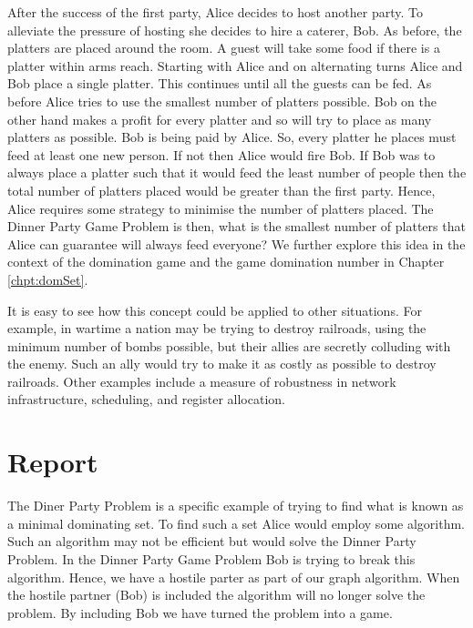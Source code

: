 After the success of the first party, Alice decides to host another party. To alleviate the pressure of hosting she decides to hire a caterer, Bob. As before, the platters are placed around the room. A guest will take some food if there is a platter within arms reach. Starting with Alice and on alternating turns Alice and Bob place a single platter. This continues until all the guests can be fed. As before Alice tries to use the smallest number of platters possible. Bob on the other hand makes a profit for every platter and so will try to place as many platters as possible. Bob is being paid by Alice. So, every platter he places must feed at least one new person. If not then Alice would fire Bob. If Bob was to always place a platter such that it would feed the least number of people then the total number of platters placed would be greater than the first party. Hence, Alice requires some strategy to minimise the number of platters placed. The Dinner Party Game Problem is then, what is the smallest number of platters that Alice can guarantee will always feed everyone? 
We further explore this idea in the context of the domination game and the game domination number in Chapter \ref{chpt:domSet}.

It is easy to see how this concept could be applied to other situations. For example, in wartime a nation may be trying to destroy railroads, using the minimum number of bombs possible, but their allies are secretly colluding with the enemy. Such an ally would try to make it as costly as possible to destroy railroads. Other examples include a measure of robustness in network infrastructure, scheduling, and register allocation.  

\section{Report}

The Diner Party Problem is a specific example of trying to find what is known as a minimal dominating set. To find such a set Alice would employ some algorithm. Such an algorithm may not be efficient but would solve the Dinner Party Problem. In the Dinner Party Game Problem Bob is trying to break this algorithm. Hence, we have a hostile parter as part of our graph algorithm. When the hostile partner (Bob) is included the algorithm will no longer solve the problem. By including Bob we have turned the problem into a game.

